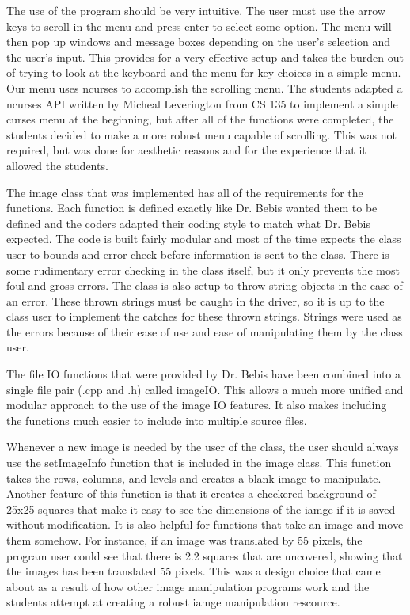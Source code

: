 \documentclass[pdftex, 11pt]{article}
\begin{document}
The use of the program should be very intuitive. The user must use the arrow keys to scroll in the menu and press enter
to select some option. The menu will then pop up windows and message boxes depending on the user's selection and the
user's input. This provides for a very effective setup and takes the burden out of trying to look at the keyboard and
the menu for key choices in a simple menu. Our menu uses ncurses to accomplish the scrolling menu. The students adapted
a ncurses API written by Micheal Leverington from CS 135 to implement a simple curses menu at the beginning, but after
all of the functions were completed, the students decided to make a more robust menu capable of scrolling. This was not
required, but was done for aesthetic reasons and for the experience that it allowed the students.

The image class that was implemented has all of the requirements for the functions. Each function is defined exactly
like Dr. Bebis wanted them to be defined and the coders adapted their coding style to match what Dr. Bebis expected. The
code is built fairly modular and most of the time expects the class user to bounds and error check before information is
sent to the class. There is some rudimentary error checking in the class itself, but it only prevents the most foul and
gross errors. The class is also setup to throw string objects in the case of an error. These thrown strings must be
caught in the driver, so it is up to the class user to implement the catches for these thrown strings. Strings were used
as the errors because of their ease of use and ease of manipulating them by the class user. 

The file IO functions that were provided by Dr. Bebis have been combined into a single file pair (.cpp and .h) called
imageIO. This allows a much more unified and modular approach to the use of the image IO features. It also makes
including the functions much easier to include into multiple source files.

Whenever a new image is needed by the user of the class, the user should always use the setImageInfo function that is
included in the image class. This function takes the rows, columns, and levels and creates a blank image to manipulate.
Another feature of this function is that it creates a checkered background of 25x25 squares that make it easy to see the
dimensions of the iamge if it is saved without modification. It is also helpful for functions that take an image and
move them somehow. For instance, if an image was translated by 55 pixels, the program user could see that there is 2.2
squares that are uncovered, showing that the images has been translated 55 pixels. This was a design choice that came
about as a result of how other image manipulation programs work and the students attempt at creating a robust iamge
manipulation rescource.
\end{document}
